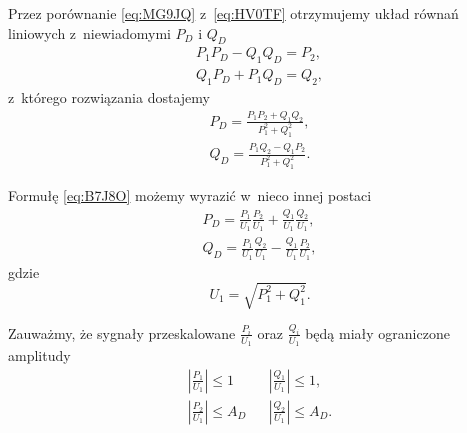 \documentclass[paper=a4,DIV=12]{tfa}
\begin{document}
Przez porównanie \eqref{eq:MG9JQ} z~\eqref{eq:HV0TF} otrzymujemy układ równań
liniowych z~niewiadomymi $P_D$ i $Q_D$
\begin{subequations}
  \begin{align}
    & P_1 P_D - Q_1 Q_D = P_2, &
    \label{eq:CKOLT}
    \\
    & Q_1 P_D + P_1 Q_D = Q_2, &
    \label{eq:5FLMS}
  \end{align}
  \label{eq:85PRD}
\end{subequations}
z~którego rozwiązania dostajemy
\begin{subequations}
  \begin{align}
    & P_D = \frac{P_1 P_2 + Q_1 Q_2}{P_1^2 + Q_1^2}, &
    \label{eq:DJRBO}
    \\
    & Q_D = \frac{P_1 Q_2 - Q_1 P_2}{P_1^2 + Q_1^2}. &
    \label{eq:AR3L3}
  \end{align}
  \label{eq:B7J8O}
\end{subequations}

Formułę \eqref{eq:B7J8O} możemy wyrazić w~nieco innej postaci
\begin{subequations}
  \begin{align}
    & P_D = \frac{P_1}{U_1} \frac{P_2}{U_1}
          + \frac{Q_1}{U_1} \frac{Q_2}{U_1}, &
    \label{eq:NXSH5}
    \\
    & Q_D = \frac{P_1}{U_1} \frac{Q_2}{U_1}
          - \frac{Q_1}{U_1} \frac{P_2}{U_1}, &
    \label{eq:6L48H}
  \end{align}
  \label{eq:F3CUU}
\end{subequations}
gdzie
\begin{equation}
  U_1 = \sqrt{P_1^2 + Q_1^2}.
  \label{eq:W79B6}
\end{equation}

Zauważmy, że sygnały przeskalowane $\frac{P_i}{U_1}$ oraz  $\frac{Q_i}{U_1}$
będą miały ograniczone amplitudy
\begin{subequations}
  \begin{align}
    & \left|\frac{P_1}{U_1}\right| \le 1 &
    & \left|\frac{Q_1}{U_1}\right| \le 1, &
    \label{eq:4AA9D}
    \\
    & \left|\frac{P_2}{U_1}\right| \le A_D &
    & \left|\frac{Q_2}{U_1}\right| \le A_D. &
    \label{eq:TX2NW}
  \end{align}
\end{subequations}
\end{document}
